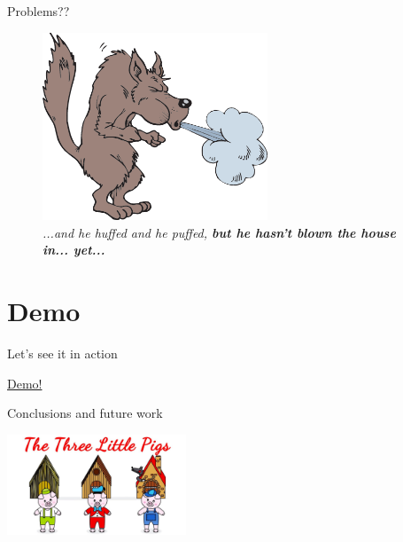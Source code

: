 \documentclass[9pt]{beamer}
\begin{document}
\begin{frame}{Problems??}
	\begin{center}
		\begin{figure}
			\includegraphics[width=0.6\textwidth,height=!]{imgs/huffedandpuffed.png}
			\caption{\textit{...and he huffed and he puffed, \textbf{but he hasn't blown the house in... yet...}}}
		\end{figure}
	\end{center}
\end{frame}

\section{Demo}
\begin{frame}{Let's see it in action}

\begin{center}
	\Huge{\href{http://localhost:8888}{Demo!}}
\end{center}

\end{frame}




\begin{frame}{Conclusions and future work}
	\begin{center}
		\includegraphics[width=0.4\textwidth,height=!,trim={29cm 0 0 5.2cm},clip]{imgs/houses.jpg}
	\end{center}
\end{frame}
\end{document}
